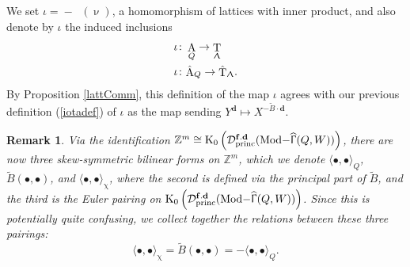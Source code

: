 \documentclass[a4paper,10pt]{amsart}
\newtheorem{remark}[theorem]{Remark}
\newcommand{\dd}{\mathbf{d}}
\renewcommand{\chi}{\upchi}
\renewcommand{\Lambda}{\Uplambda}
\renewcommand{\Gamma}{\Upgamma}
\renewcommand{\nu}{\upnu}
\DeclareMathOperator{\KK}{K_0}
\DeclareMathOperator{\Tor}{T}
\DeclareMathOperator{\Ror}{A}
\DeclareMathOperator{\fd}{\mathbf{f.d}}
\DeclareMathOperator{\Tmod}{Mod-}
\newcommand{\Rmod}[1]{\Tmod\!#1}
\DeclareMathOperator{\HGamma}{\widehat{\Gamma}}
\DeclareMathOperator{\princ}{princ}
\newcommand{\Dub}{\mathcal{D}}
\begin{document}
We set $\iota= {}-\KK(\nu)$, a homomorphism of lattices with inner product, and also denote by $\iota$ the induced inclusions
\begin{align*}
\iota\colon&\Ror_Q\rightarrow\Tor_{\Lambda}\\
\iota\colon&\hat{\Ror}_Q\rightarrow\hat{\Tor}_{\Lambda}.
\end{align*}
By Proposition \ref{lattComm}, this definition of the map $\iota$ agrees with our previous definition (\ref{iotadef}) of $\iota$ as the map sending $Y^{\dd}\mapsto X^{-\tilde{B}\cdot \dd}$.
\begin{remark}
Via the identification $\mathbb{Z}^m\cong \KK\left(\Dub_{\princ}^{\fd}(\Rmod{\HGamma(Q,W)})\right)$, there are now three skew-symmetric bilinear forms on $\mathbb{Z}^m$, which we denote $\langle\bullet ,\bullet\rangle_Q$, $\tilde{B}(\bullet,\bullet)$, and $\langle \bullet,\bullet\rangle_{\chi}$, where the second is defined via the principal part of $\tilde{B}$, and the third is the Euler pairing on $\KK\left(\Dub_{\princ}^{\fd}(\Rmod{\HGamma(Q,W)})\right)$.  Since this is potentially quite confusing, we collect together the relations between these three pairings:
\begin{equation}
\label{differentStrokes}
\langle \bullet,\bullet\rangle_{\chi}=\tilde{B}(\bullet,\bullet)=-\langle \bullet,\bullet\rangle_{Q}.
\end{equation}
\end{remark}
\end{document}
